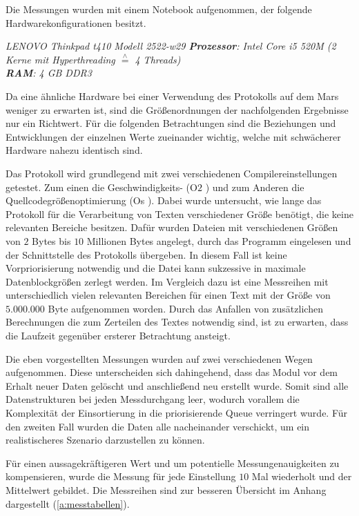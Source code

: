 \label{subCap:Messreihen}

Die Messungen wurden mit einem Notebook aufgenommen, der
folgende Hardwarekonfigurationen besitzt.

\textit{
	LENOVO Thinkpad t410 Modell 2522-w29 \newline
	\textbf{Prozessor}: Intel Core i5 520M (2 Kerne mit Hyperthreading $\stackrel{\wedge}=$ 4 Threads)\\
	\textbf{RAM}: 4 GB DDR3	
	}

Da eine ähnliche Hardware bei einer Verwendung des Protokolls auf dem Mars
weniger zu erwarten ist, sind die Größenordnungen der nachfolgenden Ergebnisse
nur ein Richtwert. Für die folgenden Betrachtungen sind die Beziehungen und
Entwicklungen der einzelnen Werte zueinander wichtig, welche mit schwächerer
Hardware nahezu identisch sind.

Das Protokoll wird grundlegend mit zwei verschiedenen
Compilereinstellungen getestet. Zum einen die Geschwindigkeits- (\glqq O$2$
\grqq) und zum Anderen die Quellcodegrößenoptimierung (\glqq Os \grqq). Dabei
wurde untersucht, wie lange das Protokoll für die Verarbeitung von Texten
verschiedener Größe benötigt, die keine relevanten Bereiche besitzen. Dafür
wurden Dateien mit verschiedenen Größen von $2$ Bytes bis $10$ Millionen Bytes 
angelegt, durch das Programm eingelesen und der Schnittstelle des Protokolls
übergeben. In diesem Fall ist keine Vorpriorisierung notwendig und die Datei
kann sukzessive in maximale Datenblockgrößen zerlegt werden.
Im Vergleich dazu ist eine Messreihen mit unterschiedlich vielen relevanten
Bereichen für einen Text mit der Größe von $5.000.000$ Byte aufgenommen
worden.
Durch das Anfallen von zusätzlichen Berechnungen die zum Zerteilen 
des Textes notwendig sind, ist zu erwarten, dass die Laufzeit gegenüber
ersterer Betrachtung ansteigt.

Die eben vorgestellten Messungen wurden auf zwei verschiedenen Wegen
aufgenommen. Diese unterscheiden sich dahingehend, dass das Modul vor dem Erhalt
neuer Daten gelöscht und anschließend neu erstellt wurde. Somit sind alle
Datenstrukturen bei jeden Messdurchgang leer, wodurch vorallem die Komplexität
der Einsortierung in die priorisierende Queue verringert wurde. Für den zweiten
Fall wurden die Daten alle nacheinander verschickt, um ein realistischeres
Szenario darzustellen zu können.

Für einen aussagekräftigeren Wert und um potentielle Messungenauigkeiten zu
kompensieren, wurde die Messung für jede Einstellung $10$ Mal wiederholt und der
Mittelwert gebildet. Die Messreihen sind zur besseren Übersicht im
Anhang dargestellt (\ref{a:messtabellen}).